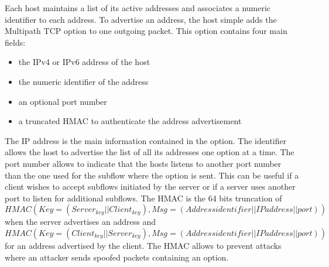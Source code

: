 \documentclass[letterpaper,10pt,english]{sphinxmanual}
\begin{document}
\sphinxAtStartPar
Each host maintains a list of its active addresses and associates a numeric identifier to each address. To advertise an address, the host simple adds the Multipath TCP  option to one outgoing packet. This option contains four main fields:
\begin{itemize}
\item {} 
\sphinxAtStartPar
the IPv4 or IPv6 address of the host

\item {} 
\sphinxAtStartPar
the numeric identifier of the address

\item {} 
\sphinxAtStartPar
an optional port number

\item {} 
\sphinxAtStartPar
a truncated HMAC to authenticate the address advertisement

\end{itemize}

\sphinxAtStartPar
The IP address is the main information contained in the  option. The identifier allows the host to advertise the list of all its addresses one option at a time. The port number allows to indicate that the hosts listens to another port number than the one used for the subflow where the option is sent. This can be useful if a client wishes to accept subflows initiated by the server or if a server uses another port to listen for additional subflows. The HMAC is the 64 bits truncation of \(HMAC(Key=(Server_{key}||Client_{key}), Msg=(Address identifier||IP address|| port))\) when the server advertises an address and \(HMAC(Key=(Client_{key}||Server_{key}), Msg=(Address identifier||IP address|| port))\) for an address advertised by the client. The HMAC allows to prevent attacks where an attacker sends spoofed packets containing an  option.
\end{document}
